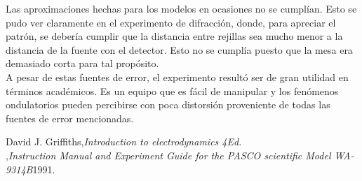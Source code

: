 \documentclass[%
 reprint,
 amsmath,amssymb,
 aps,
]{revtex4-1}
\begin{document}
Las aproximaciones hechas para los modelos en ocasiones no se cumplían. Esto se pudo ver claramente en el experimento de difracción, donde, para apreciar el patrón, se debería cumplir que la distancia entre rejillas sea mucho menor a la distancia de la fuente con el detector. Esto no se cumplía puesto que la mesa era demasiado corta para tal propósito.\\

A pesar de estas fuentes de error, el experimento resultó ser de gran utilidad en términos académicos. Es un equipo que es fácil de manipular y los fenómenos ondulatorios pueden percibirse con poca distorsión proveniente de todas las fuentes de error mencionadas. 
\\



\begin{thebibliography}{99} 
 David J. Griffiths,{\it Introduction to electrodynamics 4Ed.}\\ 
 ,{\it Instruction Manual and Experiment Guide for the PASCO scientific Model WA-9314B}{1991}.\\ 
\end{thebibliography}
\end{document}
